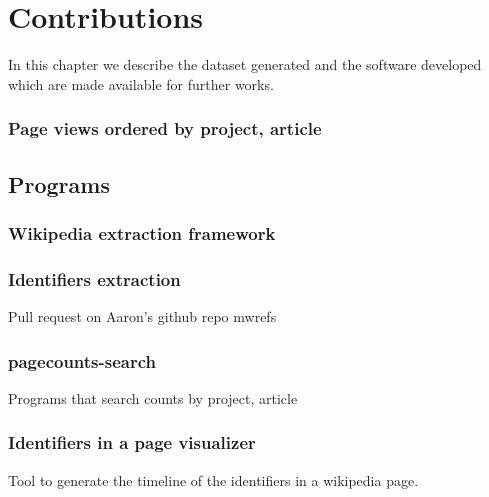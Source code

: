 
\chapter{Contributions}
\label{cha:Contributions}
In this chapter we describe the dataset generated and the software developed which are made available for further works.

\subsection{Page views ordered by project, article}
\label{sub:contrib_datasets_pagecounts}



\section{Programs}
\label{sec:Programs}

\subsection{Wikipedia extraction framework}
\label{sub:contrib_programs_framework}


\subsection{Identifiers extraction}
\label{sub:contrib_programs_idextract}
Pull request on Aaron's github repo mwrefs


\subsection{pagecounts-search}
\label{sub:contrib_programs_pagecountssearch}
Programs that search counts by project, article

\subsection{Identifiers in a page visualizer}
Tool to generate the timeline of the identifiers in a wikipedia page.

